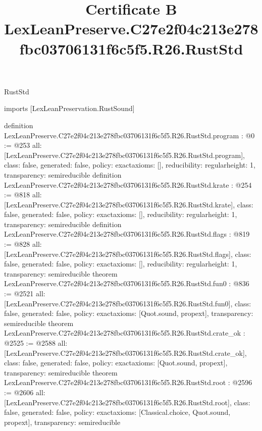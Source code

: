 \begin{lexlean}{RustStd}
\title{Certificate B LexLeanPreserve.C27e2f04c213e278fbc03706131f6c5f5.R26.RustStd}
\begin{coremodule}
imports [LexLeanPreservation.RustSound]

definition LexLeanPreserve.C27e2f04c213e278fbc03706131f6c5f5.R26.RustStd.program : @0 := @253 {
  all: [LexLeanPreserve.C27e2f04c213e278fbc03706131f6c5f5.R26.RustStd.program],
  class: false,
  generated: false,
  policy: exact{axioms: []},
  reducibility: regular{height: 1},
  transparency: semireducible
}
definition LexLeanPreserve.C27e2f04c213e278fbc03706131f6c5f5.R26.RustStd.krate : @254 := @818 {
  all: [LexLeanPreserve.C27e2f04c213e278fbc03706131f6c5f5.R26.RustStd.krate],
  class: false,
  generated: false,
  policy: exact{axioms: []},
  reducibility: regular{height: 1},
  transparency: semireducible
}
definition LexLeanPreserve.C27e2f04c213e278fbc03706131f6c5f5.R26.RustStd.flags : @819 := @828 {
  all: [LexLeanPreserve.C27e2f04c213e278fbc03706131f6c5f5.R26.RustStd.flags],
  class: false,
  generated: false,
  policy: exact{axioms: []},
  reducibility: regular{height: 1},
  transparency: semireducible
}
theorem LexLeanPreserve.C27e2f04c213e278fbc03706131f6c5f5.R26.RustStd.fun0 : @836 := @2521 {
  all: [LexLeanPreserve.C27e2f04c213e278fbc03706131f6c5f5.R26.RustStd.fun0],
  class: false,
  generated: false,
  policy: exact{axioms: [Quot.sound, propext]},
  transparency: semireducible
}
theorem LexLeanPreserve.C27e2f04c213e278fbc03706131f6c5f5.R26.RustStd.crate_ok : @2525 := @2588 {
  all: [LexLeanPreserve.C27e2f04c213e278fbc03706131f6c5f5.R26.RustStd.crate_ok],
  class: false,
  generated: false,
  policy: exact{axioms: [Quot.sound, propext]},
  transparency: semireducible
}
theorem LexLeanPreserve.C27e2f04c213e278fbc03706131f6c5f5.R26.RustStd.root : @2596 := @2606 {
  all: [LexLeanPreserve.C27e2f04c213e278fbc03706131f6c5f5.R26.RustStd.root],
  class: false,
  generated: false,
  policy: exact{axioms: [Classical.choice, Quot.sound, propext]},
  transparency: semireducible
}


\end{coremodule}
\end{lexlean}

